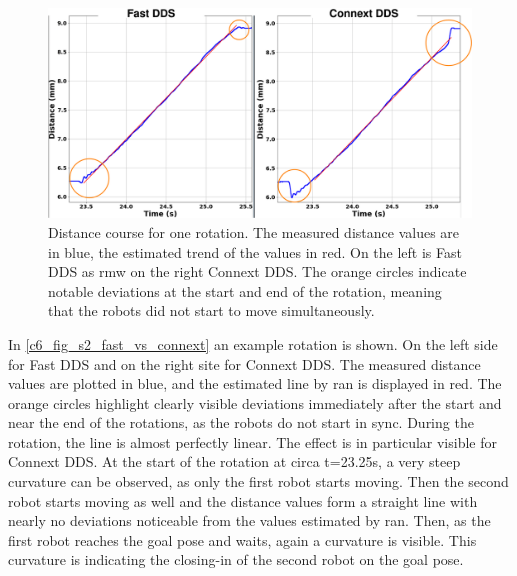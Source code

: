 \begin{figure}[htbp]
	\centering
	\includegraphics[width=1\textwidth]{Figures/c6/s2/s2_fast_vs_connext.png}
	\caption{Distance course for one rotation. The measured distance values are in blue, the estimated trend of the values in red. On the left is Fast DDS as \gls{rmw} on the right Connext DDS. The orange circles indicate notable deviations at the start and end of the rotation, meaning that the robots did not start to move simultaneously.}
	\label{c6_fig_s2_fast_vs_connext}
\end{figure}
In \autoref{c6_fig_s2_fast_vs_connext} an example rotation is shown. On the left side for Fast DDS and on the right site for Connext DDS. The measured distance values are plotted in blue, and the estimated line by \gls{ran} is displayed in red. The orange circles highlight clearly visible deviations immediately after the start and near the end of the rotations, as the robots do not start in sync. During the rotation, the line is almost perfectly linear. The effect is in particular visible for Connext DDS. At the start of the rotation at circa t=23.25s, a very steep curvature can be observed, as only the first robot starts moving. Then the second robot starts moving as well and the distance values form a straight line with nearly no deviations noticeable from the values estimated by \gls{ran}. Then, as the first robot reaches the goal pose and waits, again a curvature is visible. This curvature is indicating the closing-in of the second robot on the goal pose.\newline
